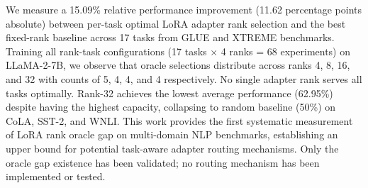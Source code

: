 
We measure a 15.09\% relative performance improvement (11.62 percentage points absolute) between per-task optimal LoRA adapter rank selection and the best fixed-rank baseline across 17 tasks from GLUE and XTREME benchmarks. Training all rank-task configurations (17 tasks × 4 ranks = 68 experiments) on LLaMA-2-7B, we observe that oracle selections distribute across ranks 4, 8, 16, and 32 with counts of 5, 4, 4, and 4 respectively. No single adapter rank serves all tasks optimally. Rank-32 achieves the lowest average performance (62.95\%) despite having the highest capacity, collapsing to random baseline (50\%) on CoLA, SST-2, and WNLI. This work provides the first systematic measurement of LoRA rank oracle gap on multi-domain NLP benchmarks, establishing an upper bound for potential task-aware adapter routing mechanisms. Only the oracle gap existence has been validated; no routing mechanism has been implemented or tested.
